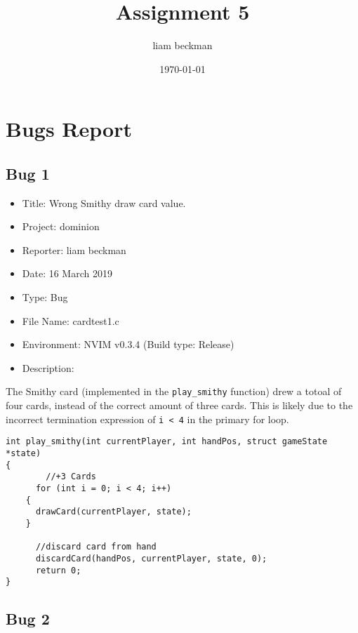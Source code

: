 \documentclass[11pt]{article}
\author{liam beckman}
\date{\today}
\title{Assignment 5}
\begin{document}
\maketitle
\tableofcontents



\section{Bugs Report}
\label{sec:bugsreport}
\subsection{Bug 1}
\label{sec:bug}

\begin{itemize}
\item Title: Wrong Smithy draw card value.
\item Project: dominion
\item Reporter: liam beckman
\item Date: 16 March 2019
\item Type: Bug
\item File Name: cardtest1.c
\item Environment: NVIM v0.3.4 (Build type: Release)
\item Description:
\end{itemize}

The Smithy card (implemented in the \texttt{play\_smithy} function) drew a totoal of four cards, instead of the correct amount of three cards. This is likely due to the incorrect termination expression of \texttt{i < 4} in the primary for loop.

\begin{verbatim}
int play_smithy(int currentPlayer, int handPos, struct gameState *state)
{
        //+3 Cards
      for (int i = 0; i < 4; i++)
    {
      drawCard(currentPlayer, state);
    }
            
      //discard card from hand
      discardCard(handPos, currentPlayer, state, 0);
      return 0;
}
\end{verbatim}

\subsection{Bug 2}
\label{sec:bug1}
\end{document}
